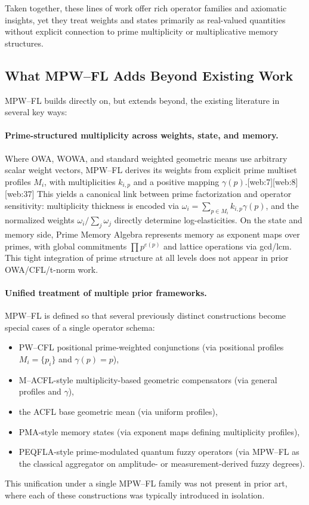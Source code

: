 \documentclass[11pt]{article}
\begin{document}
Taken together, these lines of work offer rich operator families and axiomatic insights, yet they treat weights and states primarily as real-valued quantities without explicit connection to prime multiplicity or multiplicative memory structures.

\subsection{What MPW--FL Adds Beyond Existing Work}
\label{subsec:mpw-adds}

MPW--FL builds directly on, but extends beyond, the existing literature in several key ways:

\paragraph{Prime-structured multiplicity across weights, state, and memory.}
Where OWA, WOWA, and standard weighted geometric means use arbitrary scalar weight vectors, MPW--FL derives its weights from explicit prime multiset profiles $M_i$, with multiplicities $k_{i,p}$ and a positive mapping $\gamma(p)$.[web:7][web:8][web:37] This yields a canonical link between prime factorization and operator sensitivity: multiplicity thickness is encoded via $\omega_i = \sum_{p \in M_i} k_{i,p}\gamma(p)$, and the normalized weights $\omega_i / \sum_j \omega_j$ directly determine log-elasticities. On the state and memory side, Prime Memory Algebra represents memory as exponent maps over primes, with global commitments $\prod p^{e(p)}$ and lattice operations via gcd/lcm. This tight integration of prime structure at all levels does not appear in prior OWA/CFL/t-norm work.

\paragraph{Unified treatment of multiple prior frameworks.}
MPW--FL is defined so that several previously distinct constructions become special cases of a single operator schema:
\begin{itemize}
  \item PW--CFL positional prime-weighted conjunctions (via positional profiles $M_i=\{p_i\}$ and $\gamma(p)=p$),
  \item M--ACFL-style multiplicity-based geometric compensators (via general profiles and $\gamma$),
  \item the ACFL base geometric mean (via uniform profiles),
  \item PMA-style memory states (via exponent maps defining multiplicity profiles),
  \item PEQFLA-style prime-modulated quantum fuzzy operators (via MPW--FL as the classical aggregator on amplitude- or measurement-derived fuzzy degrees).
\end{itemize}
This unification under a single MPW--FL family was not present in prior art, where each of these constructions was typically introduced in isolation.
\end{document}
